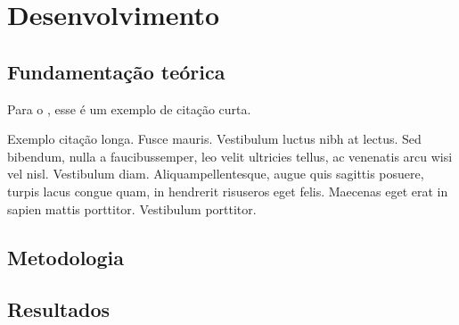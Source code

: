 \chapter{Desenvolvimento}

\section{Fundamentação teórica}

Para o , esse é um exemplo de citação curta.

\lipsum[1-5]

\begin{citacao}
Exemplo citação longa. Fusce mauris. Vestibulum luctus nibh at lectus. Sed bibendum, nulla a faucibussemper, leo velit ultricies tellus, ac venenatis arcu wisi vel nisl. Vestibulum diam. Aliquampellentesque, augue quis sagittis posuere, turpis lacus congue quam, in hendrerit risuseros eget felis. Maecenas eget erat in sapien mattis porttitor. Vestibulum porttitor.
\end{citacao}

\lipsum[5-10]

\section{Metodologia}

\section{Resultados}